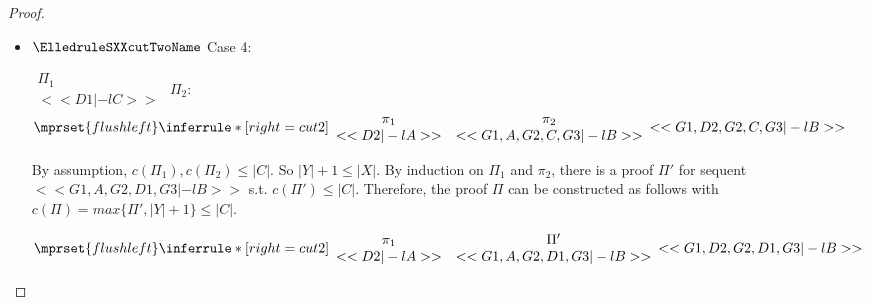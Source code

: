 \begin{proof}
\begin{enumerate}
\begin{itemize}
    \item $\ElledruleSXXcutTwoName$ Case 4:
      \begin{center}
        \scriptsize
        \begin{math}
          \begin{array}{c}
            \Pi_1 \\
            {<<D1 |-l C>>}
          \end{array}
        \end{math}
        \qquad\qquad
        $\Pi_2$:
        \begin{math}
          $$\mprset{flushleft}
          \inferrule* [right={\tiny cut2}] {
            {
              \begin{array}{cc}
                \pi_1 & \pi_2 \\
                {<<D2 |-l A>>} & {<<G1, A, G2, C, G3 |-l B>>}
              \end{array}
            }
          }{<<G1, D2, G2, C, G3 |-l B>>}
        \end{math}
      \end{center}
      By assumption, $c(\Pi_1),c(\Pi_2)\leq |C|$. So $|Y|+1 \leq |X|$. By induction on $\Pi_1$
      and $\pi_2$, there is a proof $\Pi'$ for sequent $<<G1, A, G2, D1, G3 |-l B>>$ s.t.
      $c(\Pi') \leq |C|$. Therefore, the proof $\Pi$ can be constructed as follows with
      $c(\Pi) = max\{\Pi', |Y|+1\} \leq |C|$.
      \begin{center}
        \scriptsize
        \begin{math}
          $$\mprset{flushleft}
          \inferrule* [right={\tiny cut2}] {
            {
              \begin{array}{cc}
                \pi_1 & \Pi' \\
                {<<D2 |-l A>>} & {<<G1, A, G2, D1, G3 |-l B>>}
              \end{array}
            }
          }{<<G1, D2, G2, D1, G3 |-l B>>}
        \end{math}
      \end{center}


\end{itemize}
\end{enumerate}
\end{proof}
